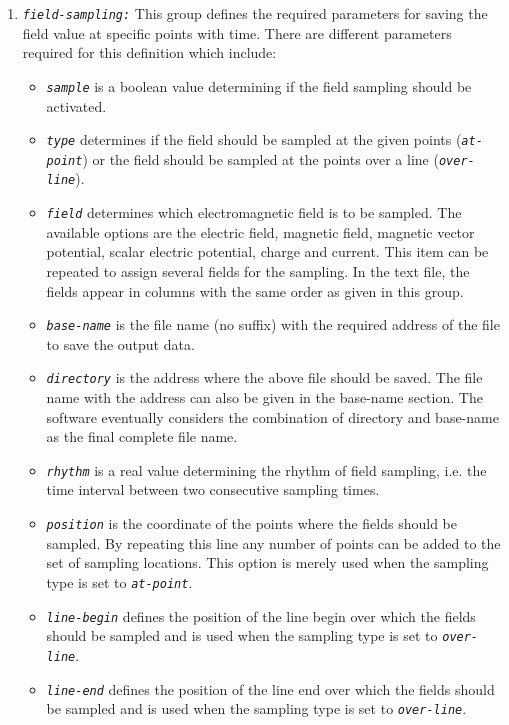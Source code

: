 \begin{enumerate}
\begin{itemize}
\end{itemize}
%
\item {\tt \small \em field-sampling:} This group defines the required parameters for saving the field value at specific points with time. There are different parameters required for this definition which include:
%
\begin{itemize}
	\item {\tt \small \em sample} is a boolean value determining if the field sampling should be activated.
	\item {\tt \small \em type} determines if the field should be sampled at the given points ({\tt \small \em at-point}) or the field should be sampled at the points over a line ({\tt \small \em over-line}).
	\item {\tt \small \em field} determines which electromagnetic field is to be sampled. The available options are the electric field, magnetic field, magnetic vector potential, scalar electric potential, charge and current. This item can be repeated to assign several fields for the sampling. In the text file, the fields appear in columns with the same order as given in this group.
	\item {\tt \small \em base-name} is the file name (no suffix) with the required address of the file to save the output data.
	\item {\tt \small \em directory} is the address where the above file should be saved. The file name with the address can also be given in the base-name section. The software eventually considers the combination of directory and base-name as the final complete file name.
	\item {\tt \small \em rhythm} is a real value determining the rhythm of field sampling, i.e. the time interval between two consecutive sampling times.
	\item {\tt \small \em position} is the coordinate of the points where the fields should be sampled. By repeating this line any number of points can be added to the set of sampling locations. This option is merely used when the sampling type is set to {\tt \small \em at-point}.
	\item {\tt \small \em line-begin} defines the position of the line begin over which the fields should be sampled and is used when the sampling type is set to {\tt \small \em over-line}.
	\item {\tt \small \em line-end} defines the position of the line end over which the fields should be sampled and is used when the sampling type is set to {\tt \small \em over-line}.

\end{itemize}
\end{enumerate}
